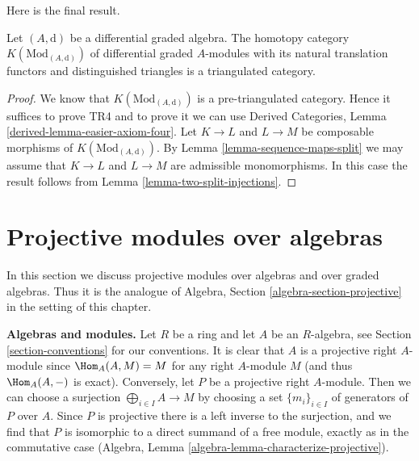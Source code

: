 \noindent
Here is the final result.

\begin{proposition}
\label{proposition-homotopy-category-triangulated}
Let $(A, \text{d})$ be a differential graded algebra. The homotopy category
$K(\text{Mod}_{(A, \text{d})})$ of differential graded $A$-modules with its
natural translation functors and distinguished triangles is a triangulated
category.
\end{proposition}

\begin{proof}
We know that $K(\text{Mod}_{(A, \text{d})})$ is a pre-triangulated category.
Hence it suffices to prove TR4 and to prove it we can use
Derived Categories, Lemma \ref{derived-lemma-easier-axiom-four}.
Let $K \to L$ and $L \to M$ be composable morphisms of
$K(\text{Mod}_{(A, \text{d})})$. By
Lemma \ref{lemma-sequence-maps-split} we may assume that
$K \to L$ and $L \to M$ are admissible monomorphisms.
In this case the result follows from
Lemma \ref{lemma-two-split-injections}.
\end{proof}













\section{Projective modules over algebras}
\label{section-projectives-over-algebras}

\noindent
In this section we discuss projective modules over algebras
and over graded algebras. Thus it is the analogue of
Algebra, Section \ref{algebra-section-projective}
in the setting of this chapter.

\medskip\noindent
{\bf Algebras and modules.} Let $R$ be a ring and let $A$ be an
$R$-algebra, see Section \ref{section-conventions} for our conventions.
It is clear that $A$ is a projective right $A$-module since
$\Hom_A(A, M) = M$ for any right $A$-module $M$ (and thus $\Hom_A(A, -)$
is exact). Conversely, let $P$ be a projective right $A$-module. Then
we can choose a surjection
$\bigoplus_{i \in I} A \to M$ by choosing a set $\{m_i\}_{i \in I}$
of generators of $P$ over $A$. Since $P$ is projective there is a
left inverse to the surjection, and we find that $P$ is isomorphic
to a direct summand of a free module, exactly as in the commutative case
(Algebra, Lemma \ref{algebra-lemma-characterize-projective}).

